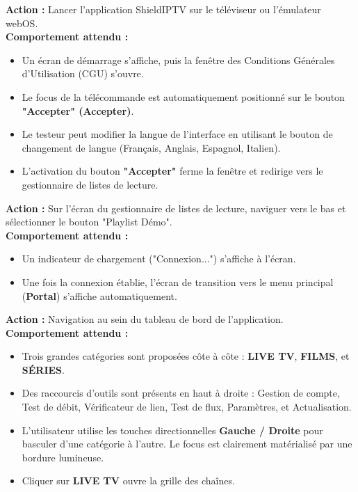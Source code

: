 \documentclass[11pt,a4paper]{article}
\newenvironment{scenario}[2]{%
  \begin{tcolorbox}[
    colback=light,
    colframe=primary,
    coltitle=white,
    title={\textbf{#1} : #2},
    fonttitle=\large\bfseries,
    arc=4px,
    boxrule=1.5pt,
    top=10pt,
    bottom=10pt,
    left=10pt,
    right=10pt
  ]
}{%
  \end{tcolorbox}
  \vspace{10pt}
}
\begin{document}
\begin{scenario}{Scénario 1}{Lancement de l'application \& CGU}
\textbf{Action :} Lancer l'application ShieldIPTV sur le téléviseur ou l'émulateur webOS.\\
\textbf{Comportement attendu :}
\begin{itemize}[leftmargin=15pt, label=\textbullet]
    \item Un écran de démarrage s'affiche, puis la fenêtre des Conditions Générales d'Utilisation (CGU) s'ouvre.
    \item Le focus de la télécommande est automatiquement positionné sur le bouton \textbf{"Accepter" (Accepter)}.
    \item Le testeur peut modifier la langue de l'interface en utilisant le bouton de changement de langue (Français, Anglais, Espagnol, Italien).
    \item L'activation du bouton \textbf{"Accepter"} ferme la fenêtre et redirige vers le gestionnaire de listes de lecture.
\end{itemize}
\end{scenario}

\begin{scenario}{Scénario 2}{Connexion avec la Playlist Démo}
\textbf{Action :} Sur l'écran du gestionnaire de listes de lecture, naviguer vers le bas et sélectionner le bouton "Playlist Démo".\\
\textbf{Comportement attendu :}
\begin{itemize}[leftmargin=15pt, label=\textbullet]
    \item Un indicateur de chargement ("Connexion...") s'affiche à l'écran.
    \item Une fois la connexion établie, l'écran de transition vers le menu principal (\textbf{Portal}) s'affiche automatiquement.
\end{itemize}
\end{scenario}

\newpage

\begin{scenario}{Scénario 3}{Navigation sur le Portail principal}
\textbf{Action :} Navigation au sein du tableau de bord de l'application.\\
\textbf{Comportement attendu :}
\begin{itemize}[leftmargin=15pt, label=\textbullet]
    \item Trois grandes catégories sont proposées côte à côte : \textbf{LIVE TV}, \textbf{FILMS}, et \textbf{SÉRIES}.
    \item Des raccourcis d'outils sont présents en haut à droite : Gestion de compte, Test de débit, Vérificateur de lien, Test de flux, Paramètres, et Actualisation.
    \item L'utilisateur utilise les touches directionnelles \textbf{Gauche / Droite} pour basculer d'une catégorie à l'autre. Le focus est clairement matérialisé par une bordure lumineuse.
    \item Cliquer sur \textbf{LIVE TV} ouvre la grille des chaînes.
\end{itemize}
\end{scenario}
\end{document}
